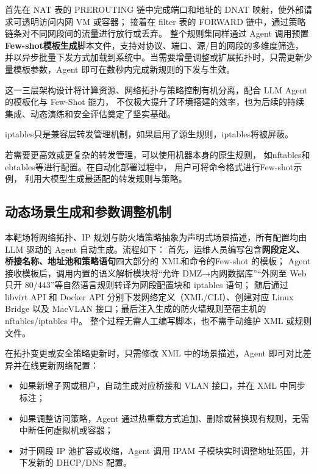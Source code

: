 \documentclass[lang=cn,10pt]{elegantbook}
\begin{document}
首先在 NAT 表的 PREROUTING 链中完成端口和地址的 DNAT 映射，使外部请求可透明访问内网 VM 或容器；
接着在 filter 表的 FORWARD 链中，通过策略链条对不同网段间的流量进行放行或丢弃。
整个规则集同样通过 Agent 调用预置\textbf{Few-shot模板生成}脚本文件，支持对协议、端口、源/目的网段的多维度筛选，
并以异步批量下发方式加载到系统中。当需要增量调整或扩展拓扑时，只需更新少量模板参数，Agent 即可在数秒内完成新规则的下发与生效。

这一三层架构设计将计算资源、网络拓扑与策略控制有机分离，配合 LLM Agent 的模板化与 Few-Shot 能力，
不仅极大提升了环境搭建的效率，也为后续的持续集成、动态演练和安全评估奠定了坚实基础。

\begin{tcolorbox}[colframe=black!30!red, colback=red!5!white, title=注意]

  iptables只是兼容层转发管理机制，如果启用了源生规则，iptables将被屏蔽。

若需要更高效或更复杂的转发管理，可以使用机器本身的原生规则，
如nftables和ebtables等进行配置。在自动化部署过程中，
用户可将命令格式进行Few-shot示例，
利用大模型生成最适配的转发规则与策略。
\end{tcolorbox}


\subsection{动态场景生成和参数调整机制}

本靶场将网络拓扑、IP 规划与防火墙策略抽象为声明式场景描述，所有配置均由 LLM 驱动的 Agent 自动生成。流程如下：  
首先，运维人员编写包含\textbf{网段定义、桥接名称、地址池和策略语句}四大部分的 XML和命令的Few-shot 的模板；  
Agent 接收模板后，调用内置的语义解析模块将“允许 DMZ→内网数据库”“外网至 Web 只开 80/443”等自然语言规则转译为网段配置块和 iptables 语句；  
随后通过 libvirt API 和 Docker API 分别下发网络定义（XML/CLI）、创建对应 Linux Bridge 以及 MacVLAN 接口；最后注入生成的防火墙规则至宿主机的 nftables/iptables 中。  
整个过程无需人工编写脚本，也不需手动维护 XML 或规则文件。

在拓扑变更或安全策略更新时，只需修改 XML 中的场景描述，Agent 即可对比差异并在线更新网络配置：  
\begin{itemize}
  \item 如果新增子网或租户，自动生成对应桥接和 VLAN 接口，并在 XML 中同步标注；  
  \item 如果调整访问策略，Agent 通过热重载方式追加、删除或替换现有规则，无需中断任何虚拟机或容器；  
  \item 对于网段 IP 池扩容或收缩，Agent 调用 IPAM 子模块实时调整地址范围，并下发新的 DHCP/DNS 配置。  
\end{itemize}
\end{document}
